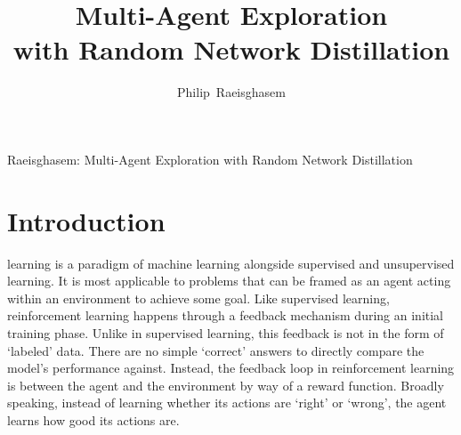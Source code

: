 \documentclass[11pt,journal,compsoc]{IEEEtran}
\begin{document}
	\title{Multi-Agent Exploration\\ with Random Network Distillation}
	
	
	\author{Philip~Raeisghasem%
		}
	
	
	
	{Raeisghasem: Multi-Agent Exploration with Random Network Distillation}
	
	
	
	
	\maketitle
	\IEEEdisplaynontitleabstractindextext
	\IEEEpeerreviewmaketitle
	
	
	\section{Introduction}
	 learning is a paradigm of machine learning alongside supervised and unsupervised learning. It is most applicable to problems that can be framed as an agent acting within an environment to achieve some goal. Like supervised learning, reinforcement learning happens through a feedback mechanism during an initial training phase. Unlike in supervised learning, this feedback is not in the form of `labeled' data. There are no simple `correct' answers to directly compare the model's performance against. Instead, the feedback loop in reinforcement learning is between the agent and the environment by way of a reward function. Broadly speaking, instead of learning whether its actions are `right' or `wrong', the agent learns how good its actions are. 
	
\end{document}
